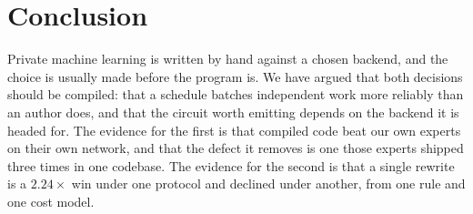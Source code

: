 \documentclass[11pt]{article}
\begin{document}
\section{Conclusion}

Private machine learning is written by hand against a chosen backend, and the
choice is usually made before the program is. We have argued that both
decisions should be compiled: that a schedule batches independent work more
reliably than an author does, and that the circuit worth emitting depends on
the backend it is headed for. The evidence for the first is that compiled code
beat our own experts on their own network, and that the defect it removes is
one those experts shipped three times in one codebase. The evidence for the
second is that a single rewrite is a $2.24\times$ win under one protocol and
declined under another, from one rule and one cost model.



\end{document}
